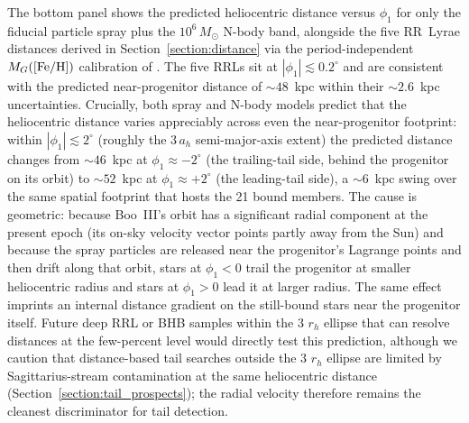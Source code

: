 \documentclass[twocolumn, apj, numberedappendix, appendixfloats]{openjournal_dhayaa}
\begin{document}
The bottom panel shows the predicted heliocentric distance versus $\phi_1$ for only the fiducial particle spray plus the $10^6\,M_\odot$ N-body band, alongside the five RR~Lyrae distances derived in Section~\ref{section:distance} via the period-independent $M_G([{\rm Fe/H}])$ calibration of \citet{Garofalo2022}. The five RRLs sit at $|\phi_1| \lesssim 0.2^\circ$ and
are consistent with the predicted near-progenitor distance of $\sim 48$~kpc within their $\sim 2.6$~kpc uncertainties. Crucially, both spray and N-body models predict that the heliocentric distance varies appreciably across even the near-progenitor footprint: within $|\phi_1| \lesssim 2^\circ$ (roughly the $3\,a_h$ semi-major-axis extent) the predicted distance changes from $\sim 46$~kpc at $\phi_1 \approx -2^\circ$ (the trailing-tail side, behind the progenitor on its orbit) to $\sim 52$~kpc at $\phi_1 \approx +2^\circ$ (the leading-tail side), a $\sim 6$~kpc swing over the same spatial footprint that hosts the 21 bound members. The cause is geometric: because Boo~III's orbit has a significant radial component at the present epoch (its on-sky velocity vector points partly away from the Sun) and because the spray particles are released near the progenitor's Lagrange points and then drift along that orbit, stars at $\phi_1 < 0$ trail the progenitor at smaller heliocentric radius and stars at $\phi_1 > 0$ lead it at larger radius. The same effect imprints an internal distance gradient on the still-bound stars near the progenitor itself.
Future deep RRL or BHB samples within the 3 $r_h$ ellipse that can resolve distances at the few-percent level would directly test this prediction, although we caution that distance-based tail searches outside the 3 $r_h$ ellipse are limited by Sagittarius-stream contamination at the same heliocentric distance (Section~\ref{section:tail_prospects}); the radial velocity therefore remains the cleanest discriminator for tail detection.
\end{document}
